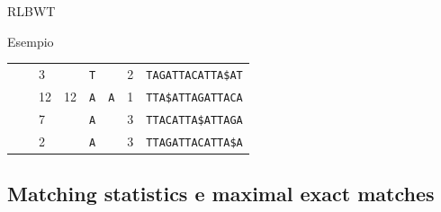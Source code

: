 \documentclass{beamer}
\begin{document}
\begin{frame}{RLBWT}
\begin{block}{Esempio\cite{rlpbwt}}
\begin{table}
\begin{tabular}{ P{0.5cm}|P{0.5cm}|P{0.4cm}|P{1.5cm}|P{0.65cm}|P{1.4cm}|P{0.6cm}|P{2.8cm}  }
                                          &           & 3     &               & {\tt T}   &           & 2 & {\tt TAGATTACATTA\$AT} \\
                                          &           & 12    & 12            & {\tt A}   & {\tt A}   & 1 & {\tt TTA\$ATTAGATTACA} \\
                                          &           & 7     &               & {\tt A}  &           & 3 & {\tt TTACATTA\$ATTAGA} \\
                                          &           & 2     &               & {\tt A}  &           & 3 & {\tt TTAGATTACATTA\$A} \\  
          \hline
        \end{tabular}
      \end{table}
    \end{block}
  
\end{frame}
\subsection{Matching statistics e maximal exact matches} 
\end{document}
